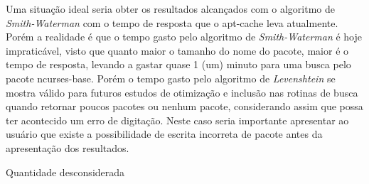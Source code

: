 Uma situação ideal seria obter os resultados alcançados com o algoritmo de \textit{Smith-Waterman} com o tempo de resposta que o {\code apt-cache} leva atualmente. Porém a realidade é que o tempo gasto pelo algoritmo de \textit{Smith-Waterman} é hoje impraticável, visto que quanto maior o tamanho do nome do pacote, maior é o tempo de resposta, levando a gastar quase 1 (um) minuto para uma busca pelo pacote {\code ncurses-base}. Porém o tempo gasto pelo algoritmo de 
\textit{Levenshtein} se mostra válido para futuros estudos de otimização e inclusão nas rotinas de busca quando retornar poucos pacotes ou nenhum pacote, considerando assim que possa ter acontecido um erro de digitação. Neste caso seria importante apresentar ao usuário que existe a possibilidade de escrita incorreta de pacote antes da apresentação dos resultados.


\begin{table}[htbp]
\caption{Comparação de resultados com entradas contendo erros de ortografia}
\label{tab:comparacao2}
\begin{description}
	\tiny
	\item [$-$] Quantidade desconsiderada
\end{description}
\end{table}

